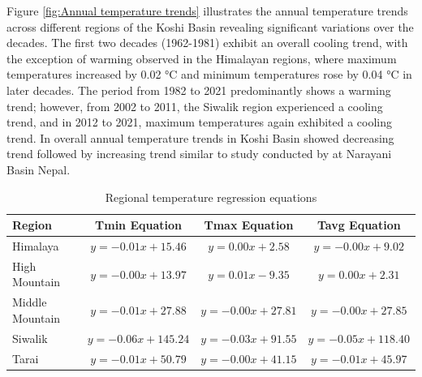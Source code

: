 Figure \ref{fig:Annual temperature trends} illustrates the annual temperature trends across different regions of the Koshi Basin revealing significant variations over the decades. The first two decades (1962-1981) exhibit an overall cooling trend, with the exception of warming observed in the Himalayan regions, where maximum temperatures increased by 0.02 °C and minimum temperatures rose by 0.04 °C in later decades. The period from 1982 to 2021 predominantly shows a warming trend; however, from 2002 to 2011, the Siwalik region experienced a cooling trend, and in 2012 to 2021, maximum temperatures again exhibited a cooling trend. In overall annual temperature trends in Koshi Basin showed decreasing trend followed by increasing trend similar to study conducted by \textcite{chand_trend_2019} at Narayani Basin Nepal. 


\begin{table}[htbp]
  \centering
  \caption{Regional temperature regression equations}
  \begin{tabular}{@{}lccc@{}}
      \toprule
      \textbf{Region} & \textbf{Tmin Equation} & \textbf{Tmax Equation} & \textbf{Tavg Equation} \\ 
      \midrule
      Himalaya & \( y = -0.01x + 15.46 \) & \( y = 0.00x + 2.58 \) & \( y = -0.00x + 9.02 \) \\ 
      High Mountain & \( y = -0.00x + 13.97 \) & \( y = 0.01x - 9.35 \) & \( y = 0.00x + 2.31 \) \\ 
      Middle Mountain & \( y = -0.01x + 27.88 \) & \( y = -0.00x + 27.81 \) & \( y = -0.00x + 27.85 \) \\ 
      Siwalik & \( y = -0.06x + 145.24 \) & \( y = -0.03x + 91.55 \) & \( y = -0.05x + 118.40 \) \\ 
      Tarai & \( y = -0.01x + 50.79 \) & \( y = -0.00x + 41.15 \) & \( y = -0.01x + 45.97 \) \\ 
      \bottomrule
  \end{tabular}
  \label{tab:regression_equations}
\end{table}


